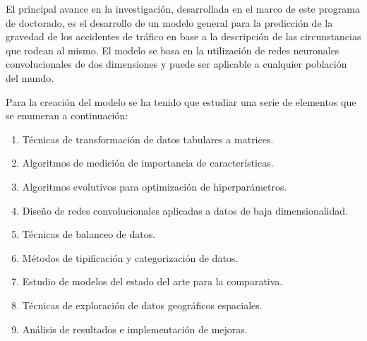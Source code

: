 El principal avance en la investigación, desarrollada en el marco de este programa de doctorado, es el desarrollo de un modelo general para la predicción de la gravedad de los accidentes de tráfico en base a la descripción de las circunstancias que rodean al mismo. El modelo se basa en la utilización de redes neuronales convolucionales de dos dimensiones y puede ser aplicable a cualquier población del mundo.



Para la creación del modelo se ha tenido que estudiar una serie de elementos que se enumeran a continuación:

\begin{enumerate}
	\item Técnicas de transformación de datos tabulares a matrices.
	\item Algoritmos de medición de importancia de características. 
	\item Algoritmos evolutivos para optimización de hiperparámetros.
	\item Diseño de redes convolucionales aplicadas a datos de baja dimensionalidad.
	\item Técnicas de balanceo de datos.
	\item Métodos de tipificación y categorización de datos.
	\item Estudio de modelos del estado del arte para la comparativa. 
	\item Técnicas de exploración de datos geográficos espaciales.
	\item Análisis de resultados e implementación de mejoras.
\end{enumerate}


